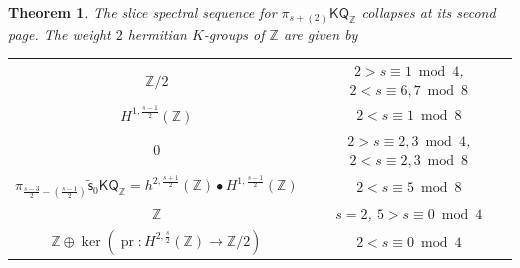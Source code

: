 \documentclass[11pt,hyp,english]{article}
\newcommand{\Z}{\mathbb{Z}}
\newcommand{\KQ}{\mathsf{KQ}}
\newcommand{\pr}{\operatorname{pr}}
\newcommand{\vs}{\tilde{\mathsf{s}}}
\newtheorem{theorem}{Theorem}[section]
\theoremstyle{definition}
\begin{document}
\begin{theorem}\label{thm:inftypageweight2KQ}
The slice spectral sequence for $\pi_{s+(2)}\KQ_\Z$ collapses at its second page.
The weight $2$ hermitian $K$-groups of $\Z$ are given by 
\begin{center}
\begin{tabular}{|c|c|}
\hline
$\Z/2$ & $2>s\equiv 1\bmod 4$, $2<s\equiv 6,7 \bmod 8$\\
$H^{1,\frac{s-1}{2}}(\Z)$ & $2<s\equiv 1 \bmod 8$ \\
$0$ & $2>s\equiv 2,3 \bmod 4$, $2<s\equiv 2,3 \bmod 8$ \\
$\pi_{\tfrac{s-3}{2}-(\tfrac{s-1}{2})}\vs_0\KQ_\Z= h^{2,\frac{s+1}{2}}(\Z)\bullet H^{1,\frac{s-1}{2}}(\Z)$ & $2<s\equiv 5\bmod 8$ \\
$\Z$ & $s=2$, $5>s\equiv 0 \bmod 4$ \\
$\Z\oplus \ker (\pr\colon H^{2,\frac{s}{2}}(\Z)\to \Z/2)$ & $2<s\equiv 0 \bmod 4$ \\
\hline
\end{tabular}
\end{center}
\end{theorem}
\end{document}

